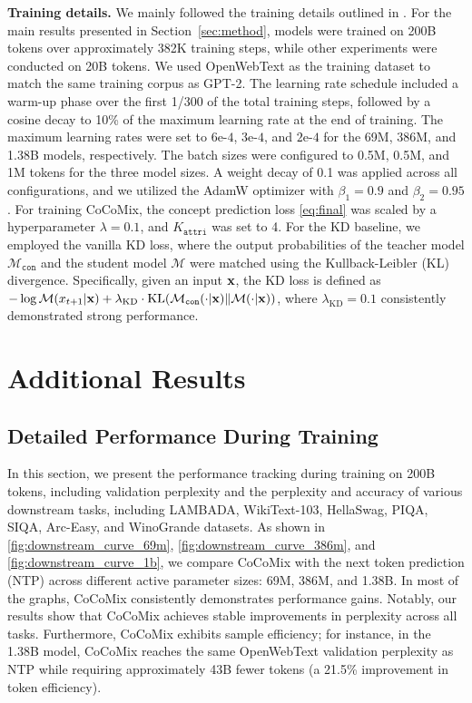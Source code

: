 \documentclass[]{fairmeta}
\newcommand{\sname}{CoCoMix\xspace}
\begin{document}
\textbf{Training details.} 
We mainly followed the training details outlined in \citep{brown2020language}. For the main results presented in Section~\ref{sec:method}, models were trained on 200B tokens over approximately 382K training steps, while other experiments were conducted on 20B tokens. We used OpenWebText as the training dataset to match the same training corpus as GPT-2. The learning rate schedule included a warm-up phase over the first 1/300 of the total training steps, followed by a cosine decay to 10\% of the maximum learning rate at the end of training. The maximum learning rates were set to $6\text{e-}4$, $3\text{e-}4$, and $2\text{e-}4$ for the 69M, 386M, and 1.38B models, respectively. The batch sizes were configured to 0.5M, 0.5M, and 1M tokens for the three model sizes. A weight decay of 0.1 was applied across all configurations, and we utilized the AdamW optimizer \citep{loshchilov2017decoupled} with $\beta_1 = 0.9$ and $\beta_2 = 0.95$. For training \sname, the concept prediction loss \autoref{eq:final} was scaled by a hyperparameter $\lambda = 0.1$, and $K_{\mathtt{attri}}$ was set to 4. For the KD baseline, we employed the vanilla KD loss, where the output probabilities of the teacher model $\mathcal{M}_{\mathtt{con}}$ and the student model $\mathcal{M}$ were matched using the Kullback-Leibler (KL) divergence. Specifically, given an input ${\mathbf{x}}$, the KD loss is defined as $-\log \mathcal{M}(x_{t+1}|{\mathbf{x}}) + \lambda_\text{KD} \cdot \mathrm{KL}(\mathcal{M}_{\mathtt{con}}(\cdot|{\mathbf{x}}) \| \mathcal{M}(\cdot|{\mathbf{x}}))$, where $\lambda_\text{KD}=0.1$ consistently demonstrated strong performance.

\section{Additional Results}

\subsection{Detailed Performance During Training}





In this section, we present the performance tracking during training on 200B tokens, including validation perplexity and the perplexity and accuracy of various downstream tasks, including LAMBADA, WikiText-103, HellaSwag, PIQA, SIQA, Arc-Easy, and WinoGrande datasets. As shown in \autoref{fig:downstream_curve_69m}, \autoref{fig:downstream_curve_386m}, and \autoref{fig:downstream_curve_1b}, we compare \sname with the next token prediction (NTP) across different active parameter sizes: 69M, 386M, and 1.38B. In most of the graphs, \sname consistently demonstrates performance gains. Notably, our results show that \sname achieves stable improvements in perplexity across all tasks. Furthermore, \sname exhibits sample efficiency; for instance, in the 1.38B model, \sname reaches the same OpenWebText validation perplexity as NTP while requiring approximately 43B fewer tokens (a 21.5\% improvement in token efficiency).
\end{document}
